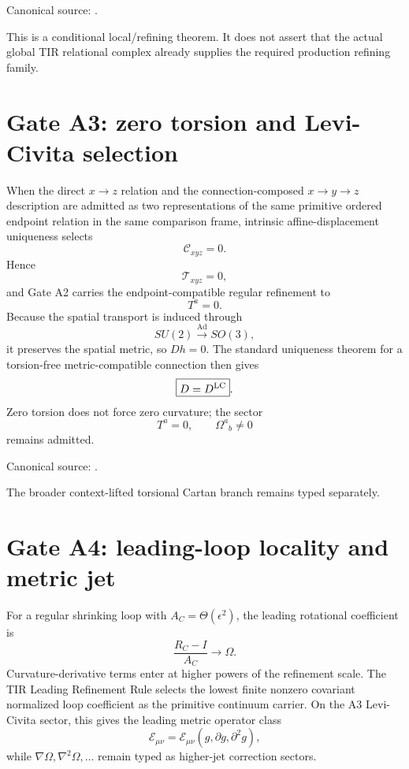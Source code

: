Canonical source:
.

This is a conditional local/refining theorem.  It does not assert that the
actual global TIR relational complex already supplies the required production
refining family.

\section{Gate A3: zero torsion and Levi-Civita selection}

When the direct \(x\to z\) relation and the connection-composed
\(x\to y\to z\) description are admitted as two representations of the same
primitive ordered endpoint relation in the same comparison frame, intrinsic
affine-displacement uniqueness selects
\[
\boxed{\mathcal C_{xyz}=0}.
\]
Hence
\[
\mathcal T_{xyz}=0,
\]
and Gate A2 carries the endpoint-compatible regular refinement to
\[
\boxed{T^a=0}.
\]
Because the spatial transport is induced through
\[
SU(2)\xrightarrow{\operatorname{Ad}}SO(3),
\]
it preserves the spatial metric, so \(Dh=0\).  The standard uniqueness theorem
for a torsion-free metric-compatible connection then gives
\[
\boxed{D=D^{\rm LC}}.
\]
Zero torsion does not force zero curvature; the sector
\[
T^a=0,
\qquad
\Omega^a{}_b\ne0
\]
remains admitted.

Canonical source:
.

The broader context-lifted torsional Cartan branch remains typed separately.

\section{Gate A4: leading-loop locality and metric jet}

For a regular shrinking loop with \(A_C=\Theta(\epsilon^2)\), the leading
rotational coefficient is
\[
\boxed{
\frac{R_C-I}{A_C}\longrightarrow\Omega.
}
\]
Curvature-derivative terms enter at higher powers of the refinement scale.
The TIR Leading Refinement Rule selects the lowest finite nonzero covariant
normalized loop coefficient as the primitive continuum carrier.  On the A3
Levi-Civita sector, this gives the leading metric operator class
\[
\boxed{
\mathcal E_{\mu\nu}
=\mathcal E_{\mu\nu}(g,\partial g,\partial^2g),
}
\]
while \(\nabla\Omega,\nabla^2\Omega,\ldots\) remain typed as higher-jet
correction sectors.


